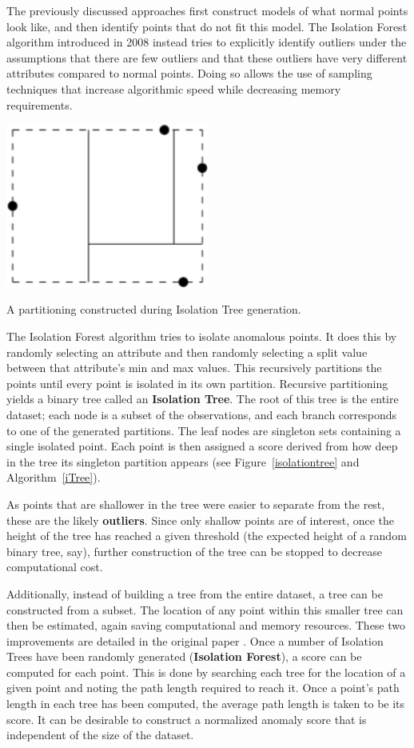 \documentclass[20pt,landscape,footrule,headrule]{foils}
\newcommand{\newl}{\newline\newline}
\def\fh{\foilhead}
\begin{document}
\fh{Isolation Forest}
The previously discussed approaches first construct models of what normal points look like, and then identify points that do not fit this model.
The Isolation Forest algorithm \cite{A15} introduced in 2008 instead tries to explicitly identify outliers under the assumptions that there are few outliers and that these outliers have very different attributes compared to normal points. Doing so allows the use of sampling techniques that increase algorithmic speed while decreasing memory requirements.
\begin{center}\includegraphics[width=0.5\textwidth]{Images/Figure14}
\end{center}
{A partitioning constructed during Isolation Tree generation.}

The Isolation Forest algorithm tries to isolate anomalous points. It does this by randomly selecting an attribute and then randomly selecting a split value between that attribute's min and max values. This recursively partitions the points until every point is isolated in its own partition.
\newl Recursive partitioning yields a binary tree called an \textbf{Isolation Tree}. The root of this tree is the entire dataset; each node is a subset of the observations, and each branch corresponds to one of the generated partitions. The leaf nodes are singleton sets containing a single isolated point. Each point is then assigned a score derived from how deep in the tree its singleton partition appears (see Figure~\ref{isolationtree} and Algorithm~\ref{iTree}). 
\par As points that are shallower in the tree were easier to separate from the rest, these are the likely \textbf{outliers}. Since only shallow points are of interest, once the height of the tree has reached a given threshold (the expected height of a random binary tree, say), further construction of the tree can be stopped to decrease computational cost. \par 
Additionally, instead of building a tree from the entire dataset, a tree can be constructed from a subset. The location of any point within this smaller tree can then be estimated, again saving computational and memory resources. These two improvements are detailed in the original paper \cite{A15}. 
\newl Once a number of Isolation Trees have been randomly generated (\textbf{Isolation Forest}), a score can be computed for each point. This is done by searching each tree for the location of a given point and noting the path length required to reach it. Once a point's path length in each tree has been computed, the average path length is taken to be its score.
\newpage\noindent  It can be desirable to construct a normalized anomaly score that is independent of the size of the dataset.
\end{document}
